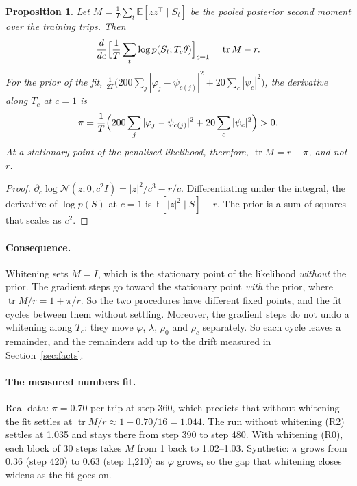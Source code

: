 \documentclass[11pt]{article}
\newtheorem{proposition}{Proposition}
\theoremstyle{remark}\newtheorem{remark}{Remark}
\newcommand{\E}{\mathbb{E}}
\newcommand{\N}{\mathcal{N}}
\begin{document}
\begin{proposition}\label{prop:scale}
Let $M=\frac1T\sum_t\E[zz^\top\mid S_t]$ be the pooled posterior second moment over the training
trips. Then
\[
\frac{d}{dc}\Bigl[\frac1T\sum_t\log p(S_t;T_c\theta)\Bigr]_{c=1}=\operatorname{tr}M-r .
\]
For the prior of the fit, $\frac{1}{2T}\bigl(200\sum_j|\varphi_j-\psi_{c(j)}|^2+20\sum_c|\psi_c|^2\bigr)$,
the derivative along $T_c$ at $c=1$ is
\[
\pi=\frac1T\Bigl(200\sum_j|\varphi_j-\psi_{c(j)}|^2+20\sum_c|\psi_c|^2\Bigr)>0 .
\]
At a stationary point of the penalised likelihood, therefore, $\operatorname{tr}M=r+\pi$, and not $r$.
\end{proposition}

\begin{proof}
$\partial_c\log\N(z;0,c^2I)=|z|^2/c^3-r/c$. Differentiating under the integral, the derivative of
$\log p(S)$ at $c=1$ is $\E[|z|^2\mid S]-r$. The prior is a sum of squares that scales as $c^2$.
\end{proof}

\paragraph{Consequence.} Whitening sets $M=I$, which is the stationary point of the likelihood
\emph{without} the prior. The gradient steps go toward the stationary point \emph{with} the prior,
where $\operatorname{tr}M/r=1+\pi/r$. So the two procedures have different fixed points, and the fit
cycles between them without settling. Moreover, the gradient steps do not undo a whitening along
$T_c$: they move $\varphi$, $\lambda$, $\rho_0$ and $\rho_c$ separately. So each cycle leaves a
remainder, and the remainders add up to the drift measured in Section~\ref{sec:facts}.

\paragraph{The measured numbers fit.} Real data: $\pi=0.70$ per trip at step 360, which predicts
that without whitening the fit settles at $\operatorname{tr}M/r\approx1+0.70/16=1.044$. The run
without whitening (R2) settles at 1.035 and stays there from step 390 to step 480. With whitening
(R0), each block of 30 steps takes $M$ from 1 back to 1.02--1.03. Synthetic: $\pi$ grows from 0.36
(step 420) to 0.63 (step 1,210) as $\varphi$ grows, so the gap that whitening closes widens as the
fit goes on.
\end{document}
